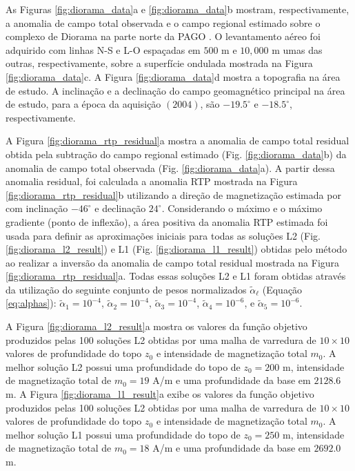 As Figuras \ref{fig:diorama_data}a e \ref{fig:diorama_data}b mostram, respectivamente, 
a anomalia de campo total observada e o campo regional estimado sobre o complexo de Diorama na parte norte da PAGO \citep{junqueira_brod2005,
marangoni_mantovani2013, oliveirajr_etal2015}.
O levantamento aéreo foi adquirido com linhas N-S e L-O espaçadas em $500$ m e $10,000$ m umas das outras, respectivamente, sobre a superfície ondulada mostrada na Figura 
\ref{fig:diorama_data}c. 
A Figura \ref{fig:diorama_data}d mostra a topografia na área de estudo.
A inclinação e a declinação do campo geomagnético principal na área de estudo, para a época da aquisição $(2004)$, são $-19.5^{\circ}$ e 
$-18.5^{\circ}$, respectivamente.

A Figura \ref{fig:diorama_rtp_residual}a mostra a anomalia de campo total residual obtida pela subtração do campo regional estimado (Fig. \ref{fig:diorama_data}b)
da anomalia de campo total observada (Fig. \ref{fig:diorama_data}a).
A partir dessa anomalia residual, foi calculada a anomalia RTP mostrada na Figura \ref{fig:diorama_rtp_residual}b utilizando a direção de magnetização estimada por \citet{zhang-2018} com inclinação $-46^{\circ}$ e declinação $24^{\circ}$.
Considerando o máximo e o máximo gradiente (ponto de inflexão), a área positiva da anomalia RTP estimada foi usada para definir as aproximações iniciais para todas as soluções L2 (Fig. \ref{fig:diorama_l2_result}) e L1 
(Fig. \ref{fig:diorama_l1_result}) obtidas pelo método ao realizar a inversão da anomalia de campo total residual mostrada na Figura \ref{fig:diorama_rtp_residual}a.
Todas essas soluções L2 e L1 foram obtidas através da utilização do seguinte conjunto de pesos normalizados $\tilde{\alpha}_{\ell}$ (Equação \ref{eq:alphas}):
$\tilde{\alpha}_{1} = 10^{-4}$, $\tilde{\alpha}_{2} = 10^{-4}$, 
$\tilde{\alpha}_{3} = 10^{-4}$, $\tilde{\alpha}_{4} = 10^{-6}$, e
$\tilde{\alpha}_{5} = 10^{-6}$.

A Figura \ref{fig:diorama_l2_result}a mostra os valores da função objetivo produzidos pelas 100 soluções L2 obtidas por uma malha de varredura de $10 \times 10$ valores de profundidade do topo $z_{0}$ e intensidade de magnetização total $m_{0}$.
A melhor solução L2 possui uma profundidade do topo de $z_{0} = 200$ m, intensidade de magnetização total de $m_{0} = 19$ A/m e uma profundidade da base em $2128.6$ m.
A Figura \ref{fig:diorama_l1_result}a exibe os valores da função objetivo produzidos pelas 100 soluções L2 obtidas por uma malha de varredura de $10 \times 10$ valores de profundidade do topo $z_{0}$ e intensidade de magnetização total $m_{0}$.
A melhor solução L1 possui uma profundidade do topo de $z_{0} = 250$ m, intensidade de magnetização total de $m_{0} = 18$ A/m e uma profundidade da base em $2692.0$ m.

